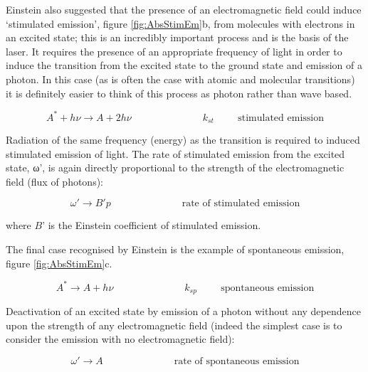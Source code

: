 \documentclass[
]{book}
\begin{document}
Einstein also suggested that the presence of an electromagnetic field could induce `stimulated emission', figure \ref{fig:AbsStimEm}b, from molecules with electrons in an excited state; this is an incredibly important process and is the basis of the laser. It requires the presence of an appropriate frequency of light in order to induce the transition from the excited state to the ground state and emission of a photon. In this case (as is often the case with atomic and molecular transitions) it is definitely easier to think of this process as photon rather than wave based.

\begin{equation}
A^\ast + h \nu \longrightarrow A + 2h \nu \hspace{3cm} k_{st} \hspace{1cm}\textrm{stimulated emission}
\label{eq:StimEm}
\end{equation}

Radiation of the same frequency (energy) as the transition is required to induced stimulated emission of light. The rate of stimulated emission from the excited state, ω', is again directly proportional to the strength of the electromagnetic field (flux of photons):

\begin{equation}
\omega ' \longrightarrow B' p \hspace{3cm} \textrm{rate of stimulated emission}
\label{eq:rateStimEm}
\end{equation}

where \(B’\) is the Einstein coefficient of stimulated emission.

The final case recognised by Einstein is the example of spontaneous emission, figure \ref{fig:AbsStimEm}c.~

\begin{equation}
A^\ast \longrightarrow A + h \nu \hspace{3cm} k_{sp} \hspace{1cm}\textrm{spontaneous emission}
\label{eq:SponEm}
\end{equation}

Deactivation of an excited state by emission of a photon without any dependence upon the strength of any electromagnetic field (indeed the simplest case is to consider the emission with no electromagnetic field):

\begin{equation}
\omega ' \longrightarrow A \hspace{3cm} \textrm{rate of spontaneous emission}
\label{eq:rateStimEm}
\end{equation}
\end{document}
